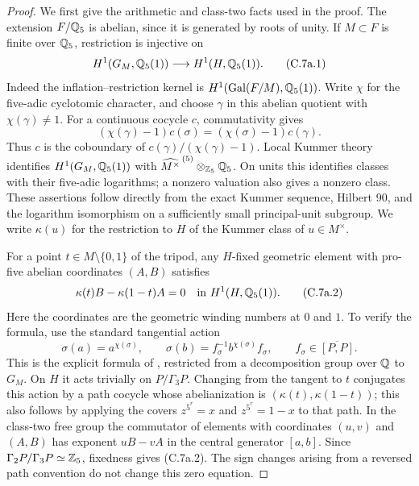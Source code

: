 \begin{proof}
We first give the arithmetic and class-two facts used in the proof.
The extension $F/\mathbb Q_5$ is abelian, since it is generated by roots of unity.
If $M\subset F$ is finite over $\mathbb Q_5$, restriction is injective on
\[
 H^1(G_M,\mathbb Q_5(1))\longrightarrow H^1(H,\mathbb Q_5(1)).                 \tag{C.7a.1}
\]
Indeed the inflation--restriction kernel is
$H^1(\operatorname{Gal}(F/M),\mathbb Q_5(1))$. Write $\chi$ for the five-adic
cyclotomic character, and choose $\gamma$ in this abelian quotient with
$\chi(\gamma)\ne1$. For a continuous cocycle $c$, commutativity gives
\[
 (\chi(\gamma)-1)c(\sigma)=(\chi(\sigma)-1)c(\gamma).
\]
Thus $c$ is the coboundary of $c(\gamma)/(\chi(\gamma)-1)$.
Local Kummer theory identifies $H^1(G_M,\mathbb Q_5(1))$ with
$\widehat{M^\times}^{\,(5)}\otimes_{\mathbb Z_5}\mathbb Q_5$. On units this identifies
classes with their five-adic logarithms; a nonzero valuation also gives
a nonzero class. These assertions follow directly from the exact Kummer
sequence, Hilbert 90, and the logarithm isomorphism on a sufficiently
small principal-unit subgroup. We write $\kappa(u)$ for the restriction
to $H$ of the Kummer class of $u\in M^\times$.

For a point $t\in M\setminus\{0,1\}$ of the tripod, any $H$-fixed
geometric element with pro-five abelian coordinates $(A,B)$ satisfies
\[
 \kappa(t) B-\kappa(1-t) A=0
 \quad\hbox{in }H^1(H,\mathbb Q_5(1)).                              \tag{C.7a.2}
\]
Here the coordinates are the geometric winding numbers at $0$ and $1$.
To verify the formula, use the standard tangential action
\[
 \sigma(a)=a^{\chi(\sigma)},\qquad
 \sigma(b)=f_\sigma^{-1}b^{\chi(\sigma)}f_\sigma,
 \qquad f_\sigma\in\overline{[P,P]}.
\]
This is the explicit formula of
\citet[\S2, equation (2.1) and the following paragraph]{BC_NakamuraSchneps2000},
restricted from a decomposition group over $\mathbb Q$ to $G_M$.
On $H$ it acts trivially on $P/\Gamma_3P$.
Changing from the tangent to $t$ conjugates this action by a path cocycle
whose abelianization is $(\kappa(t),\kappa(1-t))$; this also follows by
applying the covers $z^{5^r}=x$ and $z^{5^r}=1-x$ to that path.
In the class-two free group the commutator of elements with coordinates
$(u,v)$ and $(A,B)$ has exponent $uB-vA$ in the central generator $[a,b]$.
Since $\Gamma_2P/\Gamma_3P\simeq\mathbb Z_5$, fixedness gives (C.7a.2).
The sign changes arising from a reversed path convention do not change
this zero equation.


\end{proof}
